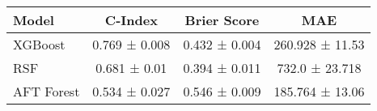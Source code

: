 \begin{tabular}{lccc}
\toprule
Model & C-Index & Brier Score & MAE \\
\midrule
XGBoost & 0.769 ± 0.008 & 0.432 ± 0.004 & 260.928 ± 11.53 \\
RSF & 0.681 ± 0.01 & 0.394 ± 0.011 & 732.0 ± 23.718 \\
AFT Forest & 0.534 ± 0.027 & 0.546 ± 0.009 & 185.764 ± 13.06 \\
\bottomrule
\end{tabular}
